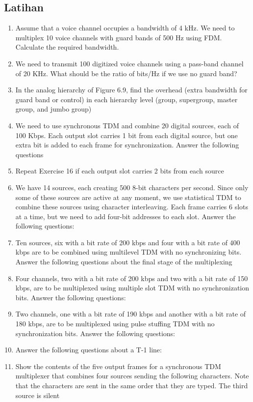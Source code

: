\subsection*{Latihan}
\begin{enumerate}[resume]
  \item Assume that a voice channel occupies a bandwidth of 4 kHz. We need to multiplex 10 voice channels with guard bands of 500 Hz using FDM. Calculate the required bandwidth.
  \item We need to transmit 100 digitized voice channels using a pass-band channel of 20 KHz. What should be the ratio of bits/Hz if we use no guard band?
  \item In the analog hierarchy of Figure 6.9, find the overhead (extra bandwidth for guard band or control) in each hierarchy level (group, supergroup, master group, and jumbo group)
  \item We need to use synchronous TDM and combine 20 digital sources, each of 100 Kbps. Each output slot carries 1 bit from each digital source, but one extra bit is added to each frame for synchronization. Answer the following questions
  \item Repeat Exercise 16 if each output slot carries 2 bits from each source
  \item We have 14 sources, each creating 500 8-bit characters per second. Since only some of these sources are active at any moment, we use statistical TDM to combine these sources using character interleaving. Each frame carries 6 slots at a time, but we need to add four-bit addresses to each slot. Answer the following questions:
  \item Ten sources, six with a bit rate of 200 kbps and four with a bit rate of 400 kbps are to be combined using multilevel TDM with no synchronizing bits. Answer the following questions about the final stage of the multiplexing
  \item Four channels, two with a bit rate of 200 kbps and two with a bit rate of 150 kbps, are to be multiplexed using multiple slot TDM with no synchronization bits. Answer the following questions:
  \item Two channels, one with a bit rate of 190 kbps and another with a bit rate of 180 kbps, are to be multiplexed using pulse stuffing TDM with no synchronization bits. Answer the following questions:
  \item Answer the following questions about a T-1 line:
  \item Show the contents of the five output frames for a synchronous TDM multiplexer that combines four sources sending the following characters. Note that the characters are sent in the same order that they are typed. The third source is silent

\end{enumerate}
